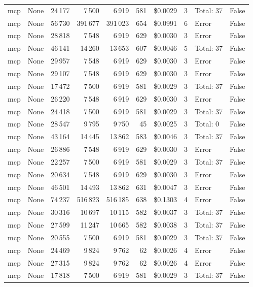 \documentclass[a4paper,11pt]{article}
\begin{document}
\begin{table}[H]
{\begin{tabular}{l r r r r r r r l r}
mcp & None & 24\,177 & 7\,500 & 6\,919 & 581 & \$0.0029 & 3 & Total: 37 & False \\
mcp & None & 56\,730 & 391\,677 & 391\,023 & 654 & \$0.0991 & 6 & Error & False \\
mcp & None & 28\,818 & 7\,548 & 6\,919 & 629 & \$0.0030 & 3 & Error & False \\
mcp & None & 46\,141 & 14\,260 & 13\,653 & 607 & \$0.0046 & 5 & Total: 37 & False \\
mcp & None & 29\,957 & 7\,548 & 6\,919 & 629 & \$0.0030 & 3 & Error & False \\
mcp & None & 29\,107 & 7\,548 & 6\,919 & 629 & \$0.0030 & 3 & Error & False \\
mcp & None & 17\,472 & 7\,500 & 6\,919 & 581 & \$0.0029 & 3 & Total: 37 & False \\
mcp & None & 26\,220 & 7\,548 & 6\,919 & 629 & \$0.0030 & 3 & Error & False \\
mcp & None & 24\,418 & 7\,500 & 6\,919 & 581 & \$0.0029 & 3 & Total: 37 & False \\
mcp & None & 28\,547 & 9\,795 & 9\,750 & 45 & \$0.0025 & 3 & Total: 0 & False \\
mcp & None & 43\,164 & 14\,445 & 13\,862 & 583 & \$0.0046 & 3 & Total: 37 & False \\
mcp & None & 26\,886 & 7\,548 & 6\,919 & 629 & \$0.0030 & 3 & Error & False \\
mcp & None & 22\,257 & 7\,500 & 6\,919 & 581 & \$0.0029 & 3 & Total: 37 & False \\
mcp & None & 20\,634 & 7\,548 & 6\,919 & 629 & \$0.0030 & 3 & Error & False \\
mcp & None & 46\,501 & 14\,493 & 13\,862 & 631 & \$0.0047 & 3 & Error & False \\
mcp & None & 74\,237 & 516\,823 & 516\,185 & 638 & \$0.1303 & 4 & Error & False \\
mcp & None & 30\,316 & 10\,697 & 10\,115 & 582 & \$0.0037 & 3 & Total: 37 & False \\
mcp & None & 27\,599 & 11\,247 & 10\,665 & 582 & \$0.0038 & 3 & Total: 37 & False \\
mcp & None & 20\,555 & 7\,500 & 6\,919 & 581 & \$0.0029 & 3 & Total: 37 & False \\
mcp & None & 24\,469 & 9\,824 & 9\,762 & 62 & \$0.0026 & 4 & Error & False \\
mcp & None & 27\,315 & 9\,824 & 9\,762 & 62 & \$0.0026 & 4 & Error & False \\
mcp & None & 17\,818 & 7\,500 & 6\,919 & 581 & \$0.0029 & 3 & Total: 37 & False \\

\end{tabular}}
\end{table}
\end{document}

